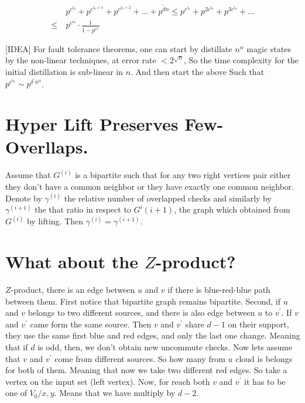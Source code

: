 \documentclass[manuscript,screen,review]{acmart}
\begin{document}
\begin{equation*}
  \begin{split}
    & p^{c^{i_{0}}}+ p^{c^{i_{0}+1}}+ p^{c^{i_{0}+2}} + ... + p^{\tilde{d}
    n}\le  p^{c^{i_{0}}}+ p^{2c^{i_{0}}}+ p^{3c^{i_{0}}} + ... \\
    \le \  & p^{c^{i_{0}}} \cdot \frac{1}{1 - p^{c^{i_{0}}}}
  \end{split}
\end{equation*}

[IDEA] For fault tolerance theorems, one can start by distillate $n^{\alpha}$
magic states by the non-linear techniques, at error rate  $< 2^{\sqrt{n}}$, So
the time complexity for the initial distillation is sub-linear in $n$. And
then start the above Such that $p^{c^{i_{0}}} \sim
p^{\delta^{\prime}n^{\alpha}}$.

\section{Hyper Lift Preserves Few-Overllaps.}

Assume that  $G^{(i)}$ is a bipartite such that for any two right vertices pair
either they don't have a common neighbor or they have exactly one common
neighbor. Denote by $\gamma^{(i)}$ the relative number of overlapped checks
and similarly by $\gamma^{(i+1)}$ the that ratio in respect to $G^i{(i+1)}$,
the graph which obtained from $G^{(i)}$ by lifting. Then $\gamma^{(i)} =
\gamma^{(i+1)}$.

\section{ What about the $Z$-product? }
$Z$-product, there is an edge between $u$ and $v$ if there is blue-red-blue
path between them. First notice that bipartite graph remains bipartite.
Second, if $u$ and $v$ belongs to two different sources, and there is also
edge between $u$ to $v^{\prime}$. If $v$ and $v^{\prime}$ came form the same
source. Then $v$ and $v^{\prime}$ share $d-1$ on their support, they use the
same first blue and red edges, and only the last one change. Meaning that if
$d$ is odd, then, we don't obtain new uncommute checks. Now lets assume that
$v$ and $v^{\prime}$ come from different sources. So how many from $u$ cloud
is belongs for both of them. Meaning that now we take two different red edges.
So take a vertex on the input set (left vertex). Now, for reach both $v$ and
$v^{\prime}$ it has to be one of $V_{0}/{x,y}$. Means that we have multiply by
$d-2$.
\end{document}

